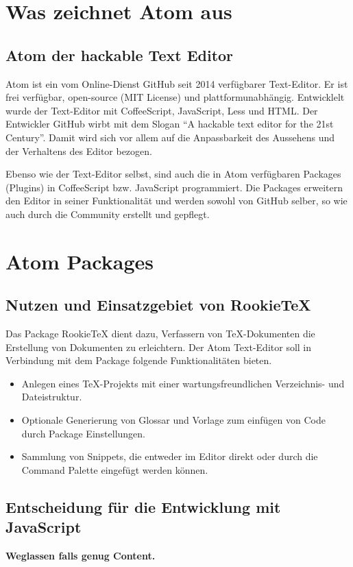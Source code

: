 \chapter{Was zeichnet Atom aus}
    \section{Atom der hackable Text Editor}
    Atom ist ein vom Online-Dienst GitHub seit 2014 verfügbarer Text-Editor. Er ist frei verfügbar, open-source (MIT License) und plattformunabhängig. Entwicklelt wurde der Text-Editor mit CoffeeScript, JavaScript, Less und HTML. Der Entwickler GitHub wirbt mit dem Slogan "`A hackable text editor for the 21st Century"'. Damit wird sich vor allem auf die Anpassbarkeit des Aussehens und der Verhaltens des Editor bezogen.

    Ebenso wie der Text-Editor selbst, sind auch die in Atom verfügbaren Packages (Plugins) in CoffeeScript bzw. JavaScript programmiert. Die Packages erweitern den Editor in seiner Funktionalität und werden sowohl von GitHub selber, so wie auch durch die Community erstellt und gepflegt.

\chapter{Atom Packages}
    \section{Nutzen und Einsatzgebiet von RookieTeX}
    Das Package RookieTeX dient dazu, Verfassern von TeX-Dokumenten die Erstellung von Dokumenten zu erleichtern. Der Atom Text-Editor soll in Verbindung mit dem Package folgende Funktionalitäten bieten.

    \begin{itemize}
        \item Anlegen eines TeX-Projekts mit einer wartungsfreundlichen Verzeichnis- und Dateistruktur.
        \item Optionale Generierung von Glossar und Vorlage zum einfügen von Code durch Package Einstellungen.
        \item Sammlung von Snippets, die entweder im Editor direkt oder durch die Command Palette eingefügt werden können.
    \end{itemize}

    \section{Entscheidung für die Entwicklung mit JavaScript}
    \textbf{Weglassen falls genug Content.}

